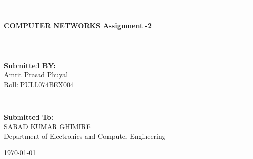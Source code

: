 \documentclass[a4paper,12pt]{article}
\newcommand{\HRule}{\rule{\linewidth}{0.1mm}} %
\begin{document}
\begin{titlepage}
	
	
	
		\HRule\\[0.4cm]
	
	{\huge\bfseries COMPUTER NETWORKS Assignment -2}\\[0.4cm] %
	
	\HRule\\[1.5cm]
	
	\vfill\vfill
	\begin{minipage}{0.4\textwidth}
		\begin{flushleft}
			\large
			\textbf{Submitted BY:} \\
			Amrit Prasad Phuyal\\ %
	Roll: PULL074BEX004 %
		\end{flushleft}
	\end{minipage}
	~
	\begin{minipage}{0.4\textwidth}
		\begin{flushright}
			\large
			\textbf{Submitted To:}\\
			{\normalsize SARAD KUMAR GHIMIRE\\Department of Electronics and Computer Engineering} %
		\end{flushright}
	\end{minipage}
	
	
	
	\vfill\vfill\vfill %
	
	{\large\today} %
	
	
	 
	
	\vfill %
	
\end{titlepage}
\end{document}
